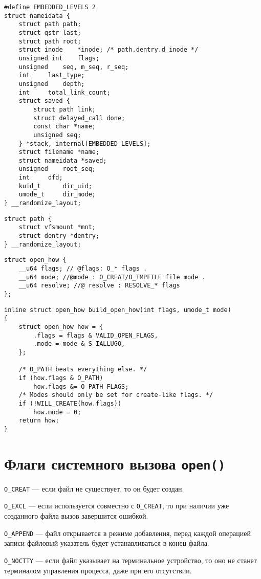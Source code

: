 \begin{lstlisting}
#define EMBEDDED_LEVELS 2
struct nameidata {
	struct path	path;
	struct qstr	last;
	struct path	root;
	struct inode	*inode; /* path.dentry.d_inode */
	unsigned int	flags;
	unsigned	seq, m_seq, r_seq;
	int		last_type;
	unsigned	depth;
	int		total_link_count;
	struct saved {
		struct path link;
		struct delayed_call done;
		const char *name;
		unsigned seq;
	} *stack, internal[EMBEDDED_LEVELS];
	struct filename	*name;
	struct nameidata *saved;
	unsigned	root_seq;
	int		dfd;
	kuid_t		dir_uid;
	umode_t		dir_mode;
} __randomize_layout;
\end{lstlisting}


\begin{lstlisting}
struct path {
	struct vfsmount *mnt;
	struct dentry *dentry;
} __randomize_layout;
\end{lstlisting}


\begin{lstlisting}
struct open_how {
	__u64 flags; // @flags: O_* flags .
	__u64 mode; //@mode : O_CREAT/O_TMPFILE file mode .
	__u64 resolve; //@ resolve : RESOLVE_* flags
};
\end{lstlisting}


\begin{lstlisting}
inline struct open_how build_open_how(int flags, umode_t mode)
{
	struct open_how how = {
		.flags = flags & VALID_OPEN_FLAGS,
		.mode = mode & S_IALLUGO,
	};

	/* O_PATH beats everything else. */
	if (how.flags & O_PATH)
		how.flags &= O_PATH_FLAGS;
	/* Modes should only be set for create-like flags. */
	if (!WILL_CREATE(how.flags))
		how.mode = 0;
	return how;
}
\end{lstlisting}


\section*{Флаги системного вызова \texttt{open()}}

\texttt{O\_CREAT} --- если файл не существует, то он будет создан.

\texttt{O\_EXCL} --- если используется совместно с \texttt{O\_CREAT}, то при наличии уже созданного файла вызов завершится ошибкой.

\texttt{O\_APPEND} --- файл открывается в режиме добавления, перед каждой операцией записи файловый указатель будет устанавливаться в конец файла.

\texttt{O\_NOCTTY} --- если файл указывает на терминальное устройство, то оно не станет терминалом управления процесса, даже при его отсутствии.

